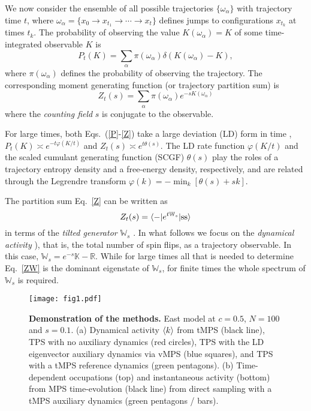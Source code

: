 \documentclass[prl,showpacs,superscriptaddress,twocolumn,longbibliography]{revtex4-1}
\newcommand{\er}[1]{Eq.~\eqref{#1}}
\newcommand{\ers}[2]{Eqs.~(\ref{#1}-\ref{#2})}
\newcommand{\beq}{\begin{equation}}
\newcommand{\eeq}{\end{equation}}
\begin{document}
We now consider the ensemble of all possible trajectories $\{\omega_{\alpha}\}$ with trajectory time $t$, where $\omega_{\alpha} = \{x_{0} \to x_{t_{1}} \to \cdots \to x_{t}\}$ defines jumps to configurations $x_{t_{k}}$ at times ${t_{k}}$. 
The probability of observing the value $K(\omega_{\alpha}) = K$ of some time-integrated observable $K$ is 
\beq
P_{t}(K) = \sum_{\alpha} \pi(\omega_{\alpha})\delta(K(\omega_{\alpha}) - K) ,
\label{P}
\eeq
where $\pi(\omega_\alpha)$ defines the probability of observing the trajectory. The corresponding moment generating function (or trajectory partition sum) is
\beq
    Z_{t}(s) = \sum_{\alpha} \pi(\omega_{\alpha})e^{-sK(\omega_{\alpha})}
    \label{Z}
\eeq
where the \emph{counting field} $s$ is conjugate to the observable. 

For large times, both \ers{P}{Z} take a large deviation (LD) form in time \cite{Touchette2009,  Garrahan2009, Garrahan2007, Lecomte2007}, $P_{t}(K) \asymp e^{-t\varphi(K/t)}$ and $Z_{t}(s) \asymp e^{t\theta(s)}$. The LD rate function $\varphi(K/t)$ and the scaled cumulant generating function (SCGF) $\theta(s)$ play the roles of a trajectory entropy density and a free-energy density, respectively, and are related through the Legrendre transform $\varphi(k) = -\min_{k} \left[\theta(s) + sk\right]$. 

The partition sum \er{Z} can be written as
\beq
    Z_{t}(s) = \braket{- | e^{t\mathbb{W}_{s}} | {\rm ss}}
    \label{ZW}
\eeq
in terms of the {\em tilted generator} $\mathbb{W}_{s}$
\cite{Touchette2009, Garrahan2007, Lecomte2007, Garrahan2009}.
In what follows we focus on the {\em dynamical activity} \cite{Garrahan2007, Lecomte2007, Garrahan2009, Maes2020}), that is, the total number of spin flips, as a trajectory observable. In this case, $\mathbb{W}_{s} = e^{-s}\mathbb{K} - \mathbb{R}$. While for large times all that is needed to determine \er{ZW} is the dominant eigenstate of $\mathbb{W}_{s}$, for  
finite times the whole spectrum of $\mathbb{W}_{s}$ is required. 


\begin{figure}[t]
    \centering
    \texttt{[image: fig1.pdf]}
    \caption{\textbf{Demonstration of the methods.} 
    East model at $c = 0.5$, $N = 100$ and $s = 0.1$.
    (a) Dynamical activity $\braket{k}$ from {tMPS} (black line), TPS with no auxiliary dynamics (red circles), TPS with the LD eigenvector auxiliary dynamics {via vMPS} (blue squares), and TPS with a {tMPS} reference dynamics (green pentagons).
    (b) Time-dependent occupations (top) and instantaneous activity (bottom) from MPS time-evolution (black line) from direct sampling with a {tMPS} auxiliary dynamics (green pentagons / bars).
    }
    \label{fig: method}
\end{figure}
\end{document}
